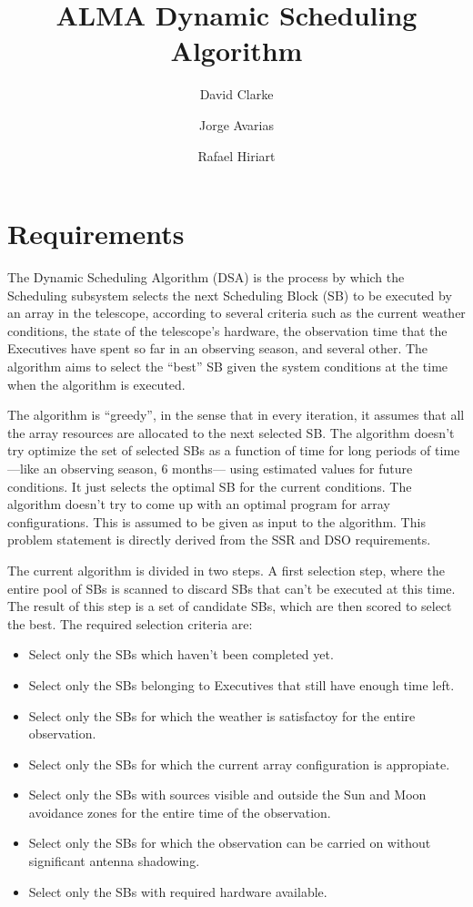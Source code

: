 \documentclass{article}
\title{ALMA Dynamic Scheduling Algorithm}
\author{David Clarke \and Jorge Avarias \and Rafael Hiriart}
\date{\RCSDate}
\begin{document}
\maketitle

\section{Requirements}

The Dynamic Scheduling Algorithm (DSA) is the process by which the Scheduling
subsystem selects the next Scheduling Block (SB) to be executed by an array in the
telescope, according to several criteria such as the current weather conditions,
the state of the telescope's hardware, the observation time that the Executives 
have spent so far in an observing season, and several other. The algorithm aims to
select the ``best'' SB given the system conditions at the time when the algorithm is
executed.

The algorithm is ``greedy'', in the sense that in every iteration, it assumes
that all the array resources are allocated to the next selected SB. The algorithm doesn't
try optimize the set of selected SBs as a function of time for long periods of time
---like an observing season, 6 months--- using estimated values for future conditions.
It just selects the optimal SB for the current conditions. The algorithm doesn't try to
come up with an optimal program for array configurations. This is assumed to be given as
input to the algorithm. This problem statement is directly derived from the SSR and
DSO requirements.

The current algorithm is divided in two steps. A first selection step, where the entire
pool of SBs is scanned to discard SBs that can't be executed
at this time. The result of this step is a set of candidate SBs, which are then scored
to select the best. The required selection criteria are:
\begin{itemize}
\item Select only the SBs which haven't been completed yet.
\item Select only the SBs belonging to Executives that still have enough time left.
\item Select only the SBs for which the weather is satisfactoy for the entire observation.
\item Select only the SBs for which the current array configuration is appropiate.
\item Select only the SBs with sources visible and outside the Sun and Moon avoidance zones
for the entire time of the observation.
\item Select only the SBs for which the observation can be carried on without significant
antenna shadowing.
\item Select only the SBs with required hardware available.
\end{itemize} 
\end{document}
